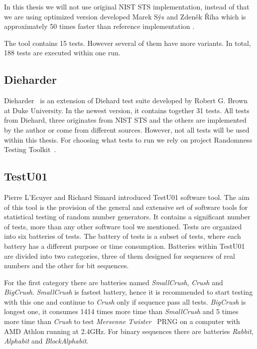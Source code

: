 \documentclass[
    digital,    %
    oneside,    %
    color,
    11pt,
    nocover,
    notable,
    nolof,
    nolot,
    final
]{fithesis3}
\renewcommand\_{\textunderscore\allowbreak}
\begin{document}
In this thesis we will not use original NIST STS implementation, instead of that we are using optimized version developed Marek Sýs and Zdeněk Říha which is approximately 50 times faster than reference implementation \cite{Sys:2016:A9O:2988516.2988228}. 

The tool contains 15 tests. However several of them have more variants. In total, 188 tests are executed within one run.

\subsection{Dieharder}

Dieharder~\cite{dieharder} is an extension of Diehard test suite \cite{diehard} developed by Robert G. Brown at Duke University. In the newest version, it contains together 31 tests. All tests from Diehard, three originates from NIST STS and the others are implemented by the author or come from different sources. However, not all tests will be used within this thesis. For choosing what tests to run we rely on project Randomness Testing Toolkit~\cite{Obratil2017thesis}.

\subsection{TestU01}

Pierre L'Ecuyer and Richard Simard introduced TestU01 software tool. The aim of this tool is the provision of the general and extensive set of software tools for statistical testing of random number generators. It contains a significant number of tests, more than any other software tool we mentioned. Tests are organized into six batteries of tests. The battery of tests is a subset of tests, where each battery has a different purpose or time consumption. Batteries within TestU01 are divided into two categories, three of them designed for sequences of real numbers and the other for bit sequences.

For the first category there are batteries named \textit{SmallCrush}, \textit{Crush} and \textit{BigCrush}. \textit{SmallCrush} is fastest battery, hence it is recommended to start testing with this one and continue to \textit{Crush} only if sequence pass all tests. \textit{BigCrush} is longest one, it consumes 1414 times more time than \textit{SmallCrush} and 5 times more time than \textit{Crush} to test \textit{Mersenne Twister}~\cite{Matsumoto:1998:MTE:272991.272995} PRNG on a computer with AMD Athlon running at 2.4GHz. For binary sequences there are batteries \textit{Rabbit}, \textit{Alphabit} and \textit{BlockAlphabit}. \cite{l2007testu01}
\end{document}
